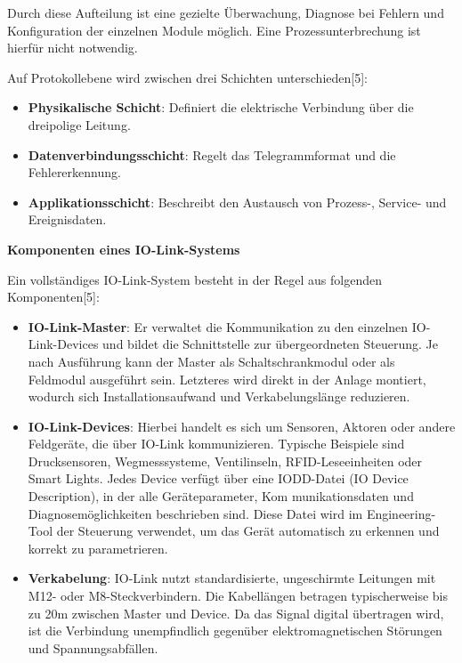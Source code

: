 Durch diese Aufteilung ist eine gezielte Überwachung, Diagnose bei Fehlern und
Konfiguration der einzelnen Module möglich. Eine Prozessunterbrechung ist hierfür
nicht notwendig.

Auf Protokollebene wird zwischen drei Schichten unterschieden[5]:


\begin{itemize}
    \item \textbf{Physikalische Schicht}: Definiert die elektrische Verbindung über die dreipolige Leitung.

    \item \textbf{Datenverbindungsschicht}: Regelt das Telegrammformat und die Fehlererkennung.

    \item \textbf{Applikationsschicht}: Beschreibt den Austausch von Prozess-, Service- und Ereignisdaten.
\end{itemize}


\textbf{Komponenten eines IO-Link-Systems}


Ein vollständiges IO-Link-System besteht in der Regel aus folgenden Komponenten[5]:

\begin{itemize}
    \item \textbf{IO-Link-Master}: Er verwaltet die Kommunikation zu den einzelnen IO-Link-Devices und bildet die Schnittstelle zur übergeordneten Steuerung. Je nach Ausführung kann der Master als Schaltschrankmodul oder als Feldmodul ausgeführt sein. Letzteres wird direkt in der Anlage montiert, wodurch sich Installationsaufwand und Verkabelungslänge reduzieren.
    
    \item \textbf{IO-Link-Devices}: Hierbei handelt es sich um Sensoren, Aktoren oder andere Feldgeräte, die über IO-Link kommunizieren. Typische Beispiele sind Drucksensoren, Wegmesssysteme, Ventilinseln, RFID-Leseeinheiten oder Smart Lights. Jedes Device verfügt über eine IODD-Datei (IO Device Description), in der alle Geräteparameter, Kom
    munikationsdaten und Diagnosemöglichkeiten beschrieben sind. Diese Datei wird
    im Engineering-Tool der Steuerung verwendet, um das Gerät automatisch zu
    erkennen und korrekt zu parametrieren.

    \item \textbf{Verkabelung}:
    IO-Link nutzt standardisierte, ungeschirmte Leitungen mit M12- oder M8-Steckverbindern.
    Die Kabellängen betragen typischerweise bis zu 20m zwischen Master und Device.
    Da das Signal digital übertragen wird, ist die Verbindung unempfindlich gegenüber
    elektromagnetischen Störungen und Spannungsabfällen.
\end{itemize}

